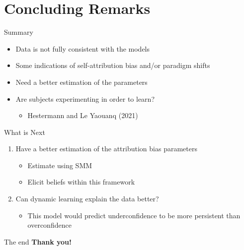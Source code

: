 \documentclass[aspectratio=169]{beamer}
\begin{document}
\section*{Concluding Remarks}

\begin{frame}{Summary}

\begin{itemize}
    \item Data is not fully consistent with the models
    \item Some indications of self-attribution bias and/or paradigm shifts
    \item Need a better estimation of the parameters
    \item Are subjects experimenting in order to learn?
    \begin{itemize}
        \item Hestermann and Le Yaouanq (2021)
    \end{itemize}
\end{itemize}
    
\end{frame}

\begin{frame}{What is Next}
    \begin{enumerate}
        \item Have a better estimation of the attribution bias parameters
        \begin{itemize}
            \item Estimate using SMM
            \item Elicit beliefs within this framework
        \end{itemize}
        \item Can dynamic learning explain the data better?
        \begin{itemize}
            \item This model would predict underconfidence to be more persistent than overconfidence
        \end{itemize}

    \end{enumerate}
    
\end{frame}


\begin{frame}{The end}
    \large\textbf{Thank you!}
\end{frame}

\appendix
\end{document}
